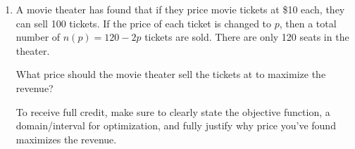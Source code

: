 \documentclass[11pt]{article}
\begin{document}
\begin{enumerate}
\begin{enumerate}
    \item Find the $x$-values of all absolute extrema of $f(x)$ on the interval $[0, 2]$.

    {\color{blue}\textbf{Solution:}
    We look for values of $f(x)$ at all critical numbers in this interval, as well as the endpoints of this interval.
    
    \begin{table}[h!]
        \centering
        \color{blue}
        \begin{tabular}{c|c}
           $x$  & $f(x)$ \\\hline
            $0$ & $0-0=0$\\
            $1$ & $3-5=-2$\\
            $2$ & $3(2)^5-5(2)^3=96-40=56$\\
        \end{tabular}\
    \end{table}
    By comparing these $f(x)$ values, we conclude that on the interval $[0, 2]$, the function $f(x)$ has its absolute maximum value at $x=2$ and has its absolute minimum value at $x=1$.
    }

    {\color{orange} Note: This part is asking for all absolute extrema. The closed interval method is the only suitable method because it is the only method we've learned that would give both absolute max and min. The first derivative test for absolute extrema would only give one absolute extrema, so it would not satisfy what this part is asking for.}
\end{enumerate}


\newpage


\item A movie theater has found that if they price movie tickets at \$10 each, they can sell 100 tickets. If the price of each ticket is changed to $p$, then a total number of $n(p)=120-2p$ tickets are sold. There are only 120 seats in the theater.
 
What price should the movie theater sell the tickets at to maximize the revenue?

To receive full credit, make sure to clearly state the objective function, a domain/interval for optimization, and fully justify why price you've found maximizes the revenue. 


\end{enumerate}
\end{document}
